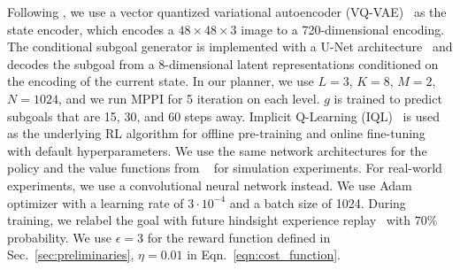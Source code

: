 Following \cite{Khazatsky2021WhatCI}, we use a vector quantized variational autoencoder (VQ-VAE)~\citep{Oord2017NeuralDR} as the state encoder, which encodes a $48 \times 48 \times 3$ image to a 720-dimensional encoding. The conditional subgoal generator is implemented with a U-Net architecture~\citep{Ronneberger2015UNetCN} and decodes the subgoal from a 8-dimensional latent representations conditioned on the encoding of the current state. In our planner, we use $L = 3$, $K = 8$, $M = 2$, $N = 1024$, and we run MPPI for 5 iteration on each level. $g$ is trained to predict subgoals that are 15, 30, and 60 steps away. Implicit Q-Learning (IQL)~\citep{kostrikov2021iql} is used as the underlying RL algorithm for offline pre-training and online fine-tuning with default hyperparameters. We use the same network architectures for the policy and the value functions from ~\citep{Khazatsky2021WhatCI} for simulation experiments. For real-world experiments, we use a convolutional neural network instead. We use Adam optimizer with a learning rate of $3 \cdot 10^{-4}$ and a batch size of 1024. During training, we relabel the goal with future hindsight experience replay~\citep{Andrychowicz2017HindsightER} with $70\%$ probability. We use $\epsilon=3$ for the reward function defined in Sec.~\ref{sec:preliminaries}, $\eta = 0.01$ in Eqn.~\ref{eqn:cost_function}. 


